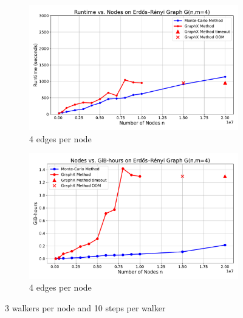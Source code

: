 \begin{figure}[H]
    \centering
    \begin{subfigure}[t]{0.47\linewidth}
        \centering
        \includegraphics[width=\linewidth]{images/plots/ER_4edg/runtime_vs_nodes_er_graph_4_edges.pdf}
        \caption{4 edges per node}
        \label{fig:4run}
    \end{subfigure}
    \begin{subfigure}[t]{0.47\linewidth}
        \centering
        \includegraphics[width=\linewidth]{images/plots/ER_4edg/gbhrs_nodes_er_graph_4edges.pdf}
        \caption{4 edges per node}
        \label{fig:4cost}
    \end{subfigure}
    \caption{3 walkers per node and 10 steps per walker}
\end{figure}

